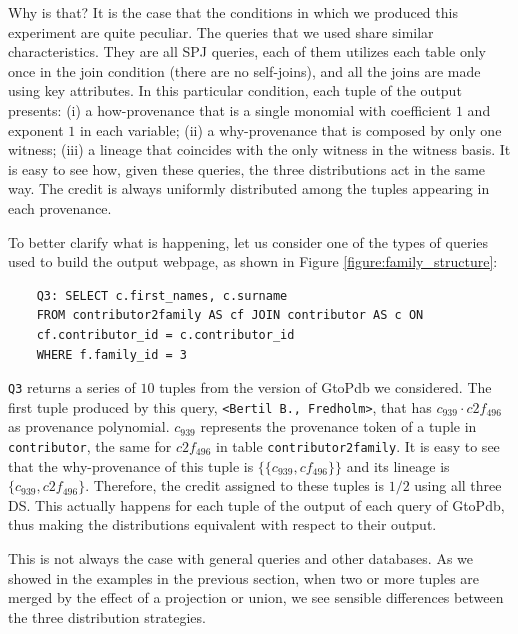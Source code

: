 Why is that? 
It is the case that the conditions in which we produced this experiment are quite peculiar. The queries that we used share similar characteristics. They are all SPJ queries, each of them utilizes each table only once in the join condition (there are no self-joins), and all the joins are made using key attributes. 
In this particular condition, each tuple of the output presents: (i) a how-provenance that is a single monomial with coefficient $1$ and exponent $1$ in each variable; (ii) a why-provenance that is composed by only one witness; (iii) a lineage that coincides with the only witness in the witness basis.
It is easy to see how, given these queries, the three distributions act in the same way.
The credit is always uniformly distributed among the tuples appearing in each provenance. 

To better clarify what is happening, let us consider one of the types of queries used to build the output webpage, as shown in Figure \ref{figure:family_structure}:

\vspace{2mm}
{\footnotesize
\begin{adjustwidth}{25pt}{5pt}
	\begin{verbatim}
	Q3: SELECT c.first_names, c.surname
	FROM contributor2family AS cf JOIN contributor AS c ON 
	cf.contributor_id = c.contributor_id 
	WHERE f.family_id = 3
\end{verbatim}
\end{adjustwidth}
}
\vspace{2mm}

\texttt{Q3} returns a series of $10$ tuples from the version of GtoPdb we considered. 
The first tuple produced by this query, \texttt{<Bertil B., Fredholm>}, that has $c_{939} \cdot c2f_{496}$ as provenance polynomial.
$c_{939}$ represents the provenance token of a tuple in \texttt{contributor}, the same for $c2f_{496}$ in table \texttt{contributor2family}. 
It is easy to see that the why-provenance of this tuple is $\{\{c_{939}, cf_{496} \}\}$ and its lineage is $\{c_{939}, c2f_{496} \}$.
Therefore, the credit assigned to these tuples is $1/2$ using all three DS.
This actually happens for each tuple of the output of each query of GtoPdb, thus making the distributions equivalent with respect to their output.

This is not always the case with general queries and other databases. As we showed in the examples in the previous section, when two or more tuples are merged by the effect of a projection or union, we see sensible differences between the three distribution strategies. %


